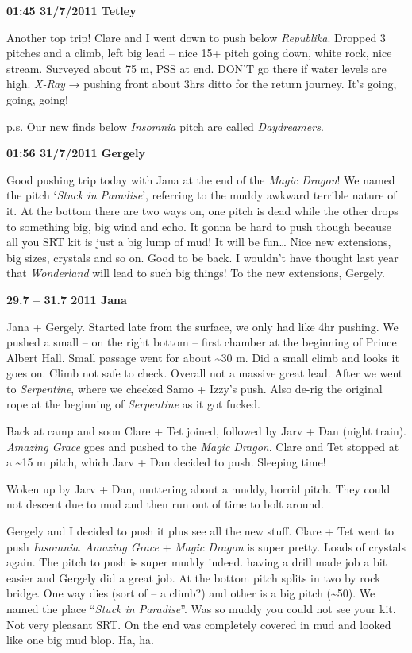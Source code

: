 \textbf{01:45 31/7/2011 Tetley}

Another top trip! Clare and I went down to push below \emph{Republika}.
Dropped 3 pitches and a climb, left big lead -- nice 15+ pitch going
down, white rock, nice stream. Surveyed about 75 m, PSS at end. DON'T go
there if water levels are high. \emph{X-Ray} → pushing front about 3hrs
ditto for the return journey. It's going, going, going!

p.s. Our new finds below \emph{Insomnia} pitch are called
\emph{Daydreamers}.

\textbf{01:56 31/7/2011 Gergely}

Good pushing trip today with Jana at the end of the \emph{Magic Dragon}!
We named the pitch `\emph{Stuck in Paradise}', referring to the muddy
awkward terrible nature of it. At the bottom there are two ways on, one
pitch is dead while the other drops to something big, big wind and echo.
It gonna be hard to push though because all you SRT kit is just a big
lump of mud! It will be fun\ldots{} Nice new extensions, big sizes,
crystals and so on. Good to be back. I wouldn't have thought last year
that \emph{Wonderland} will lead to such big things! To the new
extensions, Gergely.

\textbf{29.7 -- 31.7 2011 Jana}

Jana + Gergely. Started late from the surface, we only had like 4hr
pushing. We pushed a small -- on the right bottom -- first chamber at
the beginning of Prince Albert Hall. Small passage went for about
\textasciitilde 30 m. Did a small climb and looks it goes on. Climb not
safe to check. Overall not a massive great lead. After we went to
\emph{Serpentine}, where we checked Samo + Izzy's push. Also de-rig the
original rope at the beginning of \emph{Serpentine} as it got fucked.

Back at camp and soon Clare + Tet joined, followed by Jarv + Dan (night
train). \emph{Amazing Grace} goes and pushed to the \emph{Magic Dragon}.
Clare and Tet stopped at a \textasciitilde 15 m pitch, which Jarv + Dan
decided to push. Sleeping time!

Woken up by Jarv + Dan, muttering about a muddy, horrid pitch. They
could not descent due to mud and then run out of time to bolt around.

Gergely and I decided to push it plus see all the new stuff. Clare + Tet
went to push \emph{Insomnia}. \emph{Amazing Grace} + \emph{Magic Dragon}
is super pretty. Loads of crystals again. The pitch to push is super
muddy indeed. having a drill made job a bit easier and Gergely did a
great job. At the bottom pitch splits in two by rock bridge. One way
dies (sort of -- a climb?) and other is a big pitch
(\textasciitilde 50). We named the place ``\emph{Stuck in Paradise}''.
Was so muddy you could not see your kit. Not very pleasant SRT. On the
end was completely covered in mud and looked like one big mud blop. Ha,
ha.

